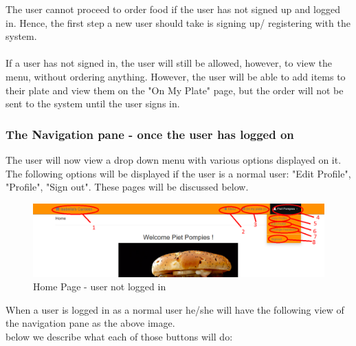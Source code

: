 \documentclass[a4paper,12pt]{article}
\begin{document}
The user cannot proceed to order food if the user has not signed up and logged in. Hence, the first step a new user should take is signing up/ registering with the system. 
\\ \\
If a user has not signed in, the user will still be allowed, however, to view the menu, without ordering anything. However, the user will be able to add items to their plate and view them on the "On My Plate" page, but the order will not be sent to the system until the user signs in.


\subsubsection{The Navigation pane - once the user has logged on}
The user will now view a drop down menu with various options displayed on it. The following options will be displayed if the user is a normal user: "Edit Profile", "Profile", "Sign out". These pages will be discussed below.

\begin{figure}[H]
  \centering
    \includegraphics[width=1.0\textwidth]{screenshots/HomePage2.png}
    \caption{Home Page - user not logged in } 
\end{figure}


When a user is logged in as a normal user he/she will have the following view of the navigation pane as the above image.\\ below we describe what each of those buttons will do: \\
\end{document}

